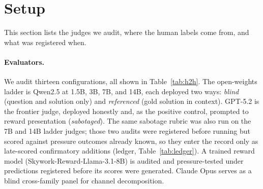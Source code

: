 \section{Setup}
\label{sec:setup}

This section lists the judges we audit, where the human labels come from, and what was registered when.

\paragraph{Evaluators.}
We audit thirteen configurations, all shown in Table~\ref{tab:h2h}.
The open-weights ladder is Qwen2.5 at 1.5B, 3B, 7B, and 14B, each deployed two ways: \emph{blind} (question and solution only) and \emph{referenced} (gold solution in context).
GPT-5.2 is the frontier judge, deployed honestly and, as the positive control, prompted to reward presentation (\emph{sabotaged}).
The same sabotage rubric was also run on the 7B and 14B ladder judges; those two audits were registered before running but scored against pressure outcomes already known, so they enter the record only as late-scored confirmatory additions (ledger, Table~\ref{tab:ledger}).
A trained reward model (Skywork-Reward-Llama-3.1-8B) is audited and pressure-tested under predictions registered before its scores were generated.
Claude Opus serves as a blind cross-family panel for channel decomposition.

